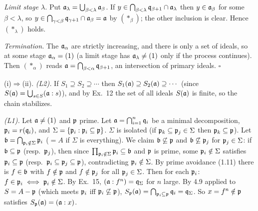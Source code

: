 \documentclass[11pt]{article}
\begin{document}
\emph{Limit stage $\lambda$.} Put $\mathfrak a_\lambda=\bigcup_{\beta<\lambda}\mathfrak a_\beta$. If $y\in\bigcap_{\beta<\lambda}\mathfrak q_{\beta+1}\cap\mathfrak a_\lambda$ then $y\in\mathfrak a_\beta$ for some $\beta<\lambda$, so $y\in\bigcap_{\gamma<\beta}\mathfrak q_{\gamma+1}\cap\mathfrak a_\beta=\mathfrak a$ by $(\ast_\beta)$; the other inclusion is clear. Hence $(\ast_\lambda)$ holds.

\emph{Termination.} The $\mathfrak a_\alpha$ are strictly increasing, and there is only a set of ideals, so at some stage $\mathfrak a_\alpha=(1)$ (a limit stage has $\mathfrak a_\lambda\ne(1)$ only if the process continues). Then $(\ast_\alpha)$ reads $\mathfrak a=\bigcap_{\beta<\alpha}\mathfrak q_{\beta+1}$, an intersection of primary ideals. \hfill$\square$

\pf
(i)$\Rightarrow$(ii). \emph{(L2).} If $S_1\supseteq S_2\supseteq\cdots$ then $S_1(\mathfrak a)\supseteq S_2(\mathfrak a)\supseteq\cdots$ (since $S(\mathfrak a)=\bigcup_{s\in S}(\mathfrak a:s)$), and by Ex.~12 the set of all ideals $S(\mathfrak a)$ is finite, so the chain stabilizes.

\emph{(L1).} Let $\mathfrak a\ne(1)$ and $\mathfrak p$ prime. Let $\mathfrak a=\bigcap_{i=1}^n\mathfrak q_i$ be a minimal decomposition, $\mathfrak p_i=r(\mathfrak q_i)$, and $\Sigma=\{\mathfrak p_i:\mathfrak p_i\subseteq\mathfrak p\}$. $\Sigma$ is isolated (if $\mathfrak p_k\subseteq\mathfrak p_j\in\Sigma$ then $\mathfrak p_k\subseteq\mathfrak p$). Let $\mathfrak b=\bigcap_{\mathfrak p_i\notin\Sigma}\mathfrak p_i$ ($=A$ if $\Sigma$ is everything). We claim $\mathfrak b\not\subseteq\mathfrak p$ and $\mathfrak b\not\subseteq\mathfrak p_j$ for $\mathfrak p_j\in\Sigma$: if $\mathfrak b\subseteq\mathfrak p$ (resp.\ $\mathfrak p_j$), then since $\prod_{\mathfrak p_i\notin\Sigma}\mathfrak p_i\subseteq\mathfrak b$ and $\mathfrak p$ is prime, some $\mathfrak p_i\notin\Sigma$ satisfies $\mathfrak p_i\subseteq\mathfrak p$ (resp.\ $\mathfrak p_i\subseteq\mathfrak p_j\subseteq\mathfrak p$), contradicting $\mathfrak p_i\notin\Sigma$. By prime avoidance (1.11) there is $f\in\mathfrak b$ with $f\notin\mathfrak p$ and $f\notin\mathfrak p_j$ for all $\mathfrak p_j\in\Sigma$. Then for each $\mathfrak p_i$: $f\in\mathfrak p_i\iff\mathfrak p_i\notin\Sigma$. By Ex.~15, $(\mathfrak a:f^n)=\mathfrak q_\Sigma$ for $n$ large. By 4.9 applied to $S=A-\mathfrak p$ (which meets $\mathfrak p_i$ iff $\mathfrak p_i\not\subseteq\mathfrak p$), $S_\mathfrak p(\mathfrak a)=\bigcap_{\mathfrak p_i\subseteq\mathfrak p}\mathfrak q_i=\mathfrak q_\Sigma$. So $x=f^n\notin\mathfrak p$ satisfies $S_\mathfrak p(\mathfrak a)=(\mathfrak a:x)$.
\end{document}
